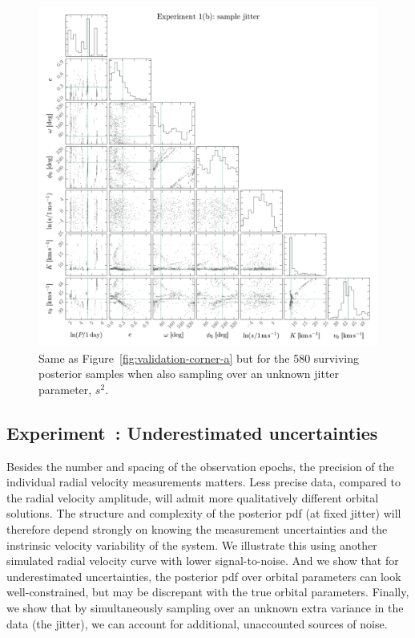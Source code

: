 \documentclass[manuscript, letterpaper]{aastex6}
\newcommand{\figname}{Figure}
\newcounter{expcounter}
\begin{document}
\begin{figure}[p]
\begin{center}
\includegraphics[width=\textwidth]{figures/validation-corner-b.pdf}
\end{center}
\caption{%
Same as \figname~\ref{fig:validation-corner-a} but for the 580 surviving posterior
samples when also sampling over an unknown jitter parameter, $s^2$.
\label{fig:validation-corner-b}}
\end{figure}

\subsection{Experiment~: Underestimated uncertainties}
\label{sec:undunc}
Besides the number and spacing of the observation epochs, the
precision of the individual radial velocity measurements matters.
Less precise data, compared to the radial velocity amplitude,
will admit more qualitatively different orbital solutions.
The structure and complexity of the posterior pdf (at fixed jitter) will
therefore depend strongly on knowing the measurement uncertainties and
the instrinsic velocity variability of the system.
We illustrate this using another simulated radial velocity curve with
lower signal-to-noise. And we show that for underestimated uncertainties,
the posterior pdf over orbital parameters can look well-constrained, but may be
discrepant with the true orbital parameters.
Finally, we show that by simultaneously sampling over an unknown extra variance in
the data (the jitter), we can account for additional, unaccounted sources of noise.
\end{document}
